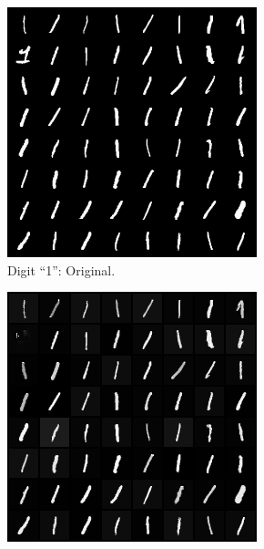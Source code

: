     \begin{figure}[h!]
        \centering
        \begin{subfigure}[b]{0.45\textwidth}
            \includegraphics[width=\textwidth]{Chapter5/results/mnist/digit_1_original.png}
            \caption{\scriptsize Digit ``1'': Original.}
        \end{subfigure}
        \begin{subfigure}[b]{0.45\textwidth}
            \includegraphics[width=\textwidth]{Chapter5/results/mnist/digit_1_reconstruction.png}

\end{subfigure}
\end{figure}
